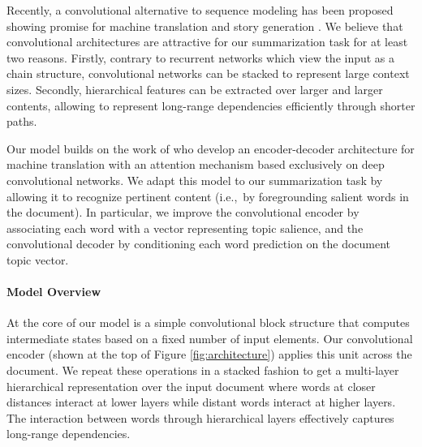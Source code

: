 
Recently, a convolutional alternative to sequence modeling has been
proposed showing promise for machine translation
\cite{convenc_mt,convseq2seq} and story generation
\cite{fan-hier-gen}. We believe that convolutional architectures are
attractive for our summarization task for at least two
reasons. Firstly, contrary to recurrent networks which view the input
as a chain structure, convolutional networks can be stacked to
represent large context sizes. Secondly, hierarchical features can be
extracted over larger and larger contents, allowing to represent
long-range dependencies efficiently through shorter paths.

Our model builds on the work of  who develop an
encoder-decoder architecture for machine translation with an attention
mechanism \cite{NIPS2015_5846} based exclusively on deep convolutional
networks. We adapt this model to our summarization task by allowing it
to recognize pertinent content (i.e.,~by foregrounding salient words
in the document).  In particular, we improve the convolutional encoder
by associating each word with a vector representing topic salience,
and the convolutional decoder by conditioning each word prediction on
the document topic vector.



\paragraph{Model Overview}

At the core of our model is a simple convolutional block structure
that computes intermediate states based on a fixed number of input
elements. Our convolutional encoder (shown at the top of Figure
\ref{fig:architecture}) applies this unit across the document. We
repeat these operations in a stacked fashion to get a multi-layer
hierarchical representation over the input document where words at
closer distances interact at lower layers while distant words interact
at higher layers. The interaction between words through hierarchical
layers effectively captures long-range dependencies. 

